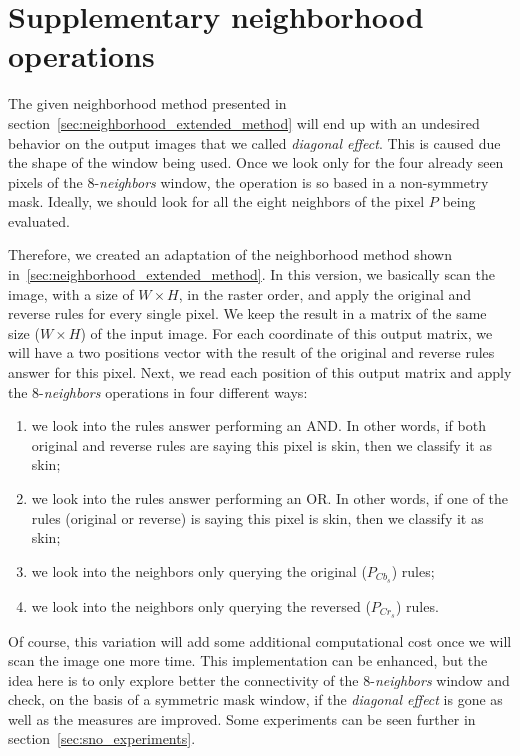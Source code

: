 \section{Supplementary neighborhood operations}
\label{sec:sup_neighborhood_operations}
The given neighborhood method presented in section~\ref{sec:neighborhood_extended_method} will end up with an undesired behavior on the output images that we called \textit{diagonal effect}. This is caused due the shape of the window being used. Once we look only for the four already seen pixels of the 8-\textit{neighbors} window, the operation is so based in a non-symmetry mask. Ideally, we should look for all the eight neighbors of the pixel $P$ being evaluated.

Therefore, we created an adaptation of the neighborhood method shown in~\ref{sec:neighborhood_extended_method}. In this version, we basically scan the image, with a size of $W \times H$, in the raster order, and apply the original and reverse rules for every single pixel. We keep the result in a matrix of the same size ($W \times H$) of the input image. For each coordinate of this output matrix, we will have a two positions vector with the result of the original and reverse rules answer for this pixel. Next, we read each position of this output matrix and apply the 8-\textit{neighbors} operations in four different ways:

\begin{enumerate}[label={(\arabic*)}]
    \item we look into the rules answer performing an AND. In other words, if both original and reverse rules are saying this pixel is skin, then we classify it as skin;
    \item we look into the rules answer performing an OR. In other words, if one of the rules (original or reverse) is saying this pixel is skin, then we classify it as skin;
    \item we look into the neighbors only querying the original ($P_{Cb_s}$) rules;
    \item we look into the neighbors only querying the reversed ($P_{Cr_s}$) rules.
\end{enumerate}

Of course, this variation will add some additional computational cost once we will scan the image one more time. This implementation can be enhanced, but the idea here is to only explore better the connectivity of the 8-\textit{neighbors} window and check, on the basis of a symmetric mask window, if the \textit{diagonal effect} is gone as well as the measures are improved. Some experiments can be seen further in section~\ref{sec:sno_experiments}.


